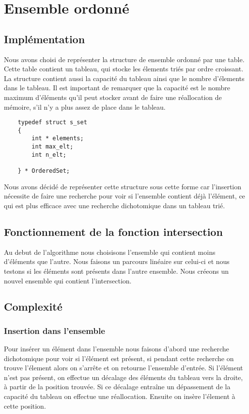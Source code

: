 \documentclass[11pt]{article}
\author{
    CHRISTOFFEL, Quentin
    \and
    NASSABAIN, Marco
}
\begin{document}
\section{Ensemble ordonné}

    \subsection{Implémentation}
    Nous avons choisi de représenter
    la structure de ensemble ordonné par une table.
    Cette table contient un tableau, qui stocke les
    élements triés par ordre croissant. La structure contient aussi
    la capacité du tableau ainsi que le nombre d'élements dans le tableau.
    Il est important de remarquer que la capacité est le
    nombre maximum d'éléments qu'il peut stocker
    avant de faire une réallocation de mémoire, s'il n'y a plus assez
    de place dans le tableau.

    \begin{verbatim}
    typedef struct s_set
    {
        int * elements;
        int max_elt;
        int n_elt;

    } * OrderedSet;
    \end{verbatim}

    Nous avons décidé de représenter cette structure sous cette forme
    car l'insertion nécessite de faire une recherche
    pour voir si l'ensemble contient déjà l'élément, ce qui est plus
    efficace avec une recherche dichotomique dans un tableau trié.

    \subsection{Fonctionnement de la fonction intersection}
    Au debut de l'algorithme nous choisisons l'ensemble qui contient moins
    d'éléments que l'autre. Nous faisons un parcours linéaire sur celui-ci
    et nous testons si les éléments sont présents dans l'autre ensemble.
    Nous créeons un nouvel ensemble qui contient l'intersection.

    \subsection{Complexité}

        \subsubsection{Insertion dans l'ensemble}
        Pour insérer un élément dans l'ensemble nous faisons d'abord une
        recherche dichotomique pour voir si l'élément est présent, si
        pendant cette recherche on trouve l'élement alors on s'arrête et
        on retourne l'ensemble d'entrée. Si l'élément n'est pas présent,
        on effectue un décalage des éléments du tableau vers la droite,
        à partir de la position trouvée. Si ce décalage entraîne un dépassement
        de la capacité du tableau on effectue une réallocation.
        Ensuite on insère l'élement à cette position.\\
\end{document}

